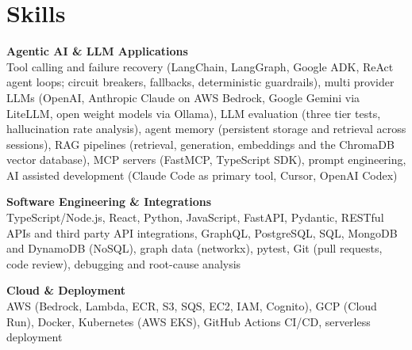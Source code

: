 \documentclass[a4paper,11pt]{article}
\newcommand{\skillgroup}[2]{{\color{headernavy}\textbf{#1}}\\ #2\par\vspace{3pt}}
\begin{document}
\section{Skills}
\skillgroup{Agentic AI \& LLM Applications}{Tool calling and failure recovery (LangChain, LangGraph, Google ADK, ReAct agent loops; circuit breakers, fallbacks, deterministic guardrails), multi provider LLMs (OpenAI, Anthropic Claude on AWS Bedrock, Google Gemini via LiteLLM, open weight models via Ollama), LLM evaluation (three tier tests, hallucination rate analysis), agent memory (persistent storage and retrieval across sessions), RAG pipelines (retrieval, generation, embeddings and the ChromaDB vector database), MCP servers (FastMCP, TypeScript SDK), prompt engineering, AI assisted development (Claude Code as primary tool, Cursor, OpenAI Codex)}
\skillgroup{Software Engineering \& Integrations}{TypeScript/Node.js, React, Python, JavaScript, FastAPI, Pydantic, RESTful APIs and third party API integrations, GraphQL, PostgreSQL, SQL, MongoDB and DynamoDB (NoSQL), graph data (networkx), pytest, Git (pull requests, code review), debugging and root-cause analysis}
\skillgroup{Cloud \& Deployment}{AWS (Bedrock, Lambda, ECR, S3, SQS, EC2, IAM, Cognito), GCP (Cloud Run), Docker, Kubernetes (AWS EKS), GitHub Actions CI/CD, serverless deployment}
\end{document}
